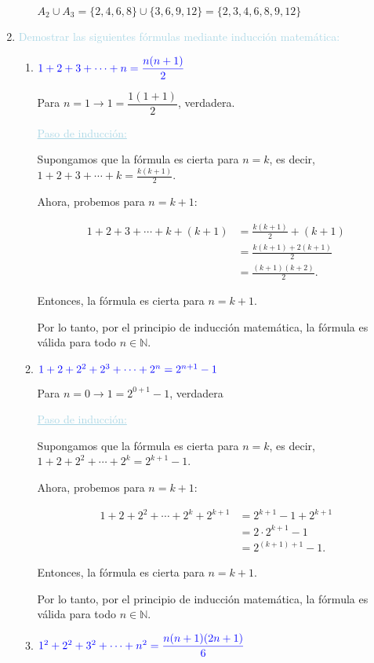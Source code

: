 \documentclass[12pt]{article}
\newcommand{\bu}[1]{\textcolor{lightblue}{\underline{#1}}}
\newcommand{\lb}[1]{\textcolor{lightblue}{#1}}
\newcommand{\db}[1]{\textcolor{blue}{#1}}
\begin{document}
\begin{enumerate}[label=\color{red}\textbf{\arabic*)},leftmargin=*]
\begin{itemize}[label=$-$]
      	$A_2\cup A_3=\{2,4,6,8\}\cup\{3,6,9,12\}=\{2,3,4,6,8,9,12\}$
      \end{itemize}
      \item \lb{Demostrar las siguientes fórmulas mediante inducción matemática:}
      \begin{enumerate}[label=\color{red}\alph*)]
      	\item $\db{1+2+3+\cdots+n=\dfrac{n(n+1)}{2}}$
      	
      	Para $n=1\longrightarrow 1=\dfrac{1(1+1)}{2}$, verdadera.
      	
      	\bu{Paso de inducción:}
      	
      	Supongamos que la fórmula es cierta para \(n = k\), es decir, \(1+2+3+\cdots+k = \frac{k(k+1)}{2}\).
      	
      	Ahora, probemos para \(n = k + 1\):
      	
      	
      	\begin{align*}
      		1+2+3+\cdots+k+(k+1) &= \frac{k(k+1)}{2} + (k+1) \\
      		&= \frac{k(k+1) + 2(k+1)}{2} \\
      		&= \frac{(k+1)(k+2)}{2}.
      	\end{align*}
      	
      	
      	Entonces, la fórmula es cierta para \(n = k + 1\).
      	
      	Por lo tanto, por el principio de inducción matemática, la fórmula es válida para todo \(n \in \mathbb{N}\).
      	\item $\db{1+2+2^2+2^3+\cdots+2^n=2^{n+1}-1}$
      	
      	Para $n=0\longrightarrow 1=2^{0+1}-1$, verdadera
      	
      	\bu{Paso de inducción:}
      	
      Supongamos que la fórmula es cierta para \(n = k\), es decir, \(1+2+2^2+\cdots+2^k = 2^{k+1} - 1\).
      
      Ahora, probemos para \(n = k + 1\):
      
      
      \begin{align*}
      	1+2+2^2+\cdots+2^k+2^{k+1} &= 2^{k+1} - 1 + 2^{k+1} \\
      	&= 2 \cdot 2^{k+1} - 1 \\
      	&= 2^{(k+1)+1} - 1.
      \end{align*}
      
      
      Entonces, la fórmula es cierta para \(n = k + 1\).
      
      Por lo tanto, por el principio de inducción matemática, la fórmula es válida para todo \(n \in \mathbb{N}\).
      	\item $\db{1^2+2^2+3^2+\cdots+n^2=\dfrac{n(n+1)(2n+1)}{6}}$
      	

\end{enumerate}
\end{enumerate}
\end{document}
